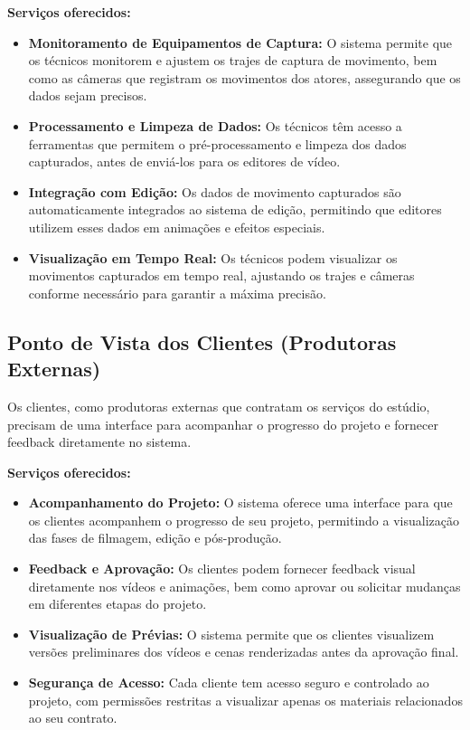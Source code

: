 \textbf{Serviços oferecidos:}
\begin{itemize}
  \item \textbf{Monitoramento de Equipamentos de Captura:} O sistema permite que os técnicos monitorem e ajustem os trajes de captura de movimento, bem como as câmeras que registram os movimentos dos atores, assegurando que os dados sejam precisos.
  \item \textbf{Processamento e Limpeza de Dados:} Os técnicos têm acesso a ferramentas que permitem o pré-processamento e limpeza dos dados capturados, antes de enviá-los para os editores de vídeo.
  \item \textbf{Integração com Edição:} Os dados de movimento capturados são automaticamente integrados ao sistema de edição, permitindo que editores utilizem esses dados em animações e efeitos especiais.
  \item \textbf{Visualização em Tempo Real:} Os técnicos podem visualizar os movimentos capturados em tempo real, ajustando os trajes e câmeras conforme necessário para garantir a máxima precisão.
\end{itemize}

\subsection{Ponto de Vista dos Clientes (Produtoras Externas)}

Os clientes, como produtoras externas que contratam os serviços do estúdio, precisam de uma interface para acompanhar o progresso do projeto e fornecer feedback diretamente no sistema.

\textbf{Serviços oferecidos:}
\begin{itemize}
  \item \textbf{Acompanhamento do Projeto:} O sistema oferece uma interface para que os clientes acompanhem o progresso de seu projeto, permitindo a visualização das fases de filmagem, edição e pós-produção.
  \item \textbf{Feedback e Aprovação:} Os clientes podem fornecer feedback visual diretamente nos vídeos e animações, bem como aprovar ou solicitar mudanças em diferentes etapas do projeto.
  \item \textbf{Visualização de Prévias:} O sistema permite que os clientes visualizem versões preliminares dos vídeos e cenas renderizadas antes da aprovação final.
  \item \textbf{Segurança de Acesso:} Cada cliente tem acesso seguro e controlado ao projeto, com permissões restritas a visualizar apenas os materiais relacionados ao seu contrato.
\end{itemize}

